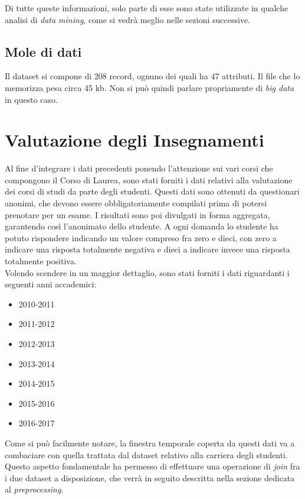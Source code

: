 Di tutte queste informazioni, solo parte di esse sono state utilizzate in qualche analisi di \textit{data mining}, come si vedrà meglio nelle sezioni successive.

\subsection{Mole di dati}

Il dataset si compone di 208 record, ognuno dei quali ha 47 attributi. Il file che lo memorizza pesa circa 45 kb. Non si può quindi parlare propriamente di \textit{big data} in questo caso.

\section{Valutazione degli Insegnamenti}

Al fine d'integrare i dati precedenti ponendo l'attenzione sui vari corsi che compongono il Corso di Laurea, sono stati forniti i dati relativi alla valutazione dei corsi di studi da parte degli studenti. Questi dati sono ottenuti da questionari anonimi, che devono essere obbligatoriamente compilati prima di potersi prenotare per un esame. I risultati sono poi divulgati in forma aggregata, garantendo così l'anonimato dello studente. A ogni domanda lo studente ha potuto rispondere indicando un valore compreso fra zero e dieci, con zero a indicare una risposta totalmente negativa e dieci a indicare invece una risposta totalmente positiva.\\

Volendo scendere in un maggior dettaglio, sono stati forniti i dati riguardanti i seguenti anni accademici:

\begin{itemize}
	\item 2010-2011
	\item 2011-2012
	\item 2012-2013
	\item 2013-2014
	\item 2014-2015
	\item 2015-2016
	\item 2016-2017
\end{itemize}

Come si può facilmente notare, la finestra temporale coperta da questi dati va a combaciare con quella trattata dal dataset relativo alla carriera degli studenti. Questo aspetto fondamentale ha permesso di effettuare una operazione di \textit{join} fra i due dataset a disposizione, che verrà in seguito descritta nella sezione dedicata al \textit{preprocessing}.

